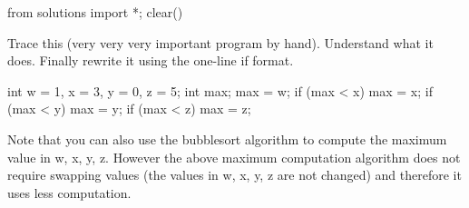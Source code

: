 \begin{python0}
from solutions import *; clear()
\end{python0}

Trace this (very very very important program by hand). Understand what
it does. Finally rewrite it using the one-line if format.\\
\begin{console}
int w = 1, x = 3, y = 0, z = 5;
int max;
max = w;
if (max < x)
   max = x;
if (max < y)
   max = y;
if (max < z)
   max = z; 
\end{console}

Note that you can also use the bubblesort algorithm to compute the
maximum value in w, x, y, z. However the above maximum computation
algorithm does not require swapping values (the values in w, x, y, z are
not changed) and therefore it uses less computation.


